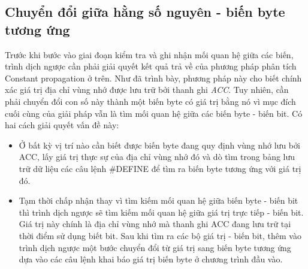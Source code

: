 \subsection{Chuyển đổi giữa hằng số nguyên - biến byte tương ứng}
\label{sec:transfer}
Trước khi bước vào giai đoạn kiểm tra và ghi nhận mối quan hệ giữa các biến, trình dịch ngược cần phải giải quyết kết quả trả về của phương pháp phân tích Constant propagation ở trên. Như đã trình bày, phương pháp này cho biết chính xác giá trị địa chỉ vùng nhớ được lưu trữ bởi thanh ghi \textit{ACC}. Tuy nhiên, cần phải chuyển đổi con số này thành một biến byte có giá trị bằng nó vì mục đích cuối cùng của giải pháp vẫn là tìm mối quan hệ giữa các biến byte - biến bit. Có hai cách giải quyết vấn đề này:
\begin{itemize}
	\item Ở bất kỳ vị trí nào cần biết được biến byte đang quy định vùng nhớ lưu bởi ACC, lấy giá trị thực sự của địa chỉ vùng nhớ đó và dò tìm trong bảng lưu trữ dữ liệu các câu lệnh \#DEFINE để tìm ra biến byte tương ứng với giá trị đó.
	\item Tạm thời chấp nhận thay vì tìm kiếm mối quan hệ giữa biến byte - biến bit thì trình dịch ngược sẽ tìm kiếm mối quan hệ giữa giá trị trực tiếp - biến bit. Giá trị này chính là địa chỉ vùng nhớ mà thanh ghi ACC đang lưu trữ tại thời điểm sử dụng biết bit. Sau khi tìm ra các bộ giá trị - biến bit, thêm vào trình dịch ngược một bước chuyển đổi từ giá trị sang biến byte tương ứng dựa vào các câu lệnh khai báo giá trị biến byte ở chương trình đầu vào.
\end{itemize}

